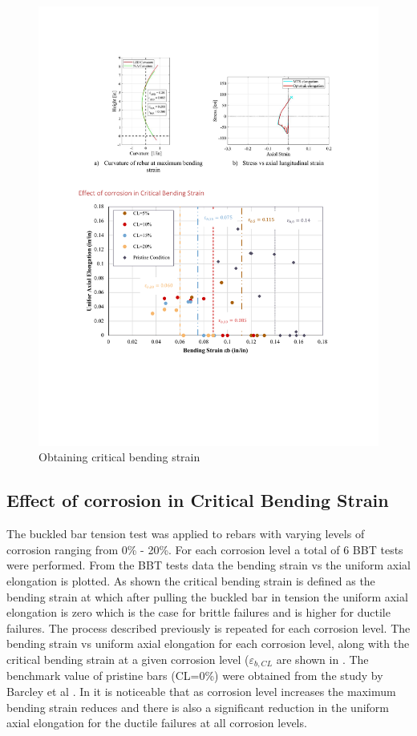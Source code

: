 \begin{figure}[htbp]
	\centering
	\includegraphics[width=1\textwidth]{VAC Thesis 2.0/Chapter-4/figs/BBT_curvature.pdf}
	\caption{Obtaining critical bending strain}
	\label{fig:bendingstrain}
\end{figure}

\subsection{Effect of corrosion in Critical Bending Strain}

The buckled bar tension test was applied to rebars with varying levels of corrosion ranging from 0\% - 20\%. For each corrosion level a total of 6 BBT tests were performed. From the BBT tests data the bending strain vs the uniform axial elongation is plotted. As shown  the critical bending strain is defined as the bending strain at which after pulling the buckled bar in tension the uniform axial elongation is zero which is the case for brittle failures and is higher for ductile failures. The process described previously is repeated for each corrosion level. The bending strain vs uniform axial elongation for each corrosion level, along with the critical bending strain at a given corrosion level ($\varepsilon_{b,CL}$ are shown in  . The benchmark value of pristine bars (CL=0\%) were obtained from the study by Barcley et al \cite{Barcley2018}. In  it is noticeable that as corrosion level increases the maximum bending strain reduces and there is also a significant reduction in the uniform axial elongation for the ductile failures at all corrosion levels.

